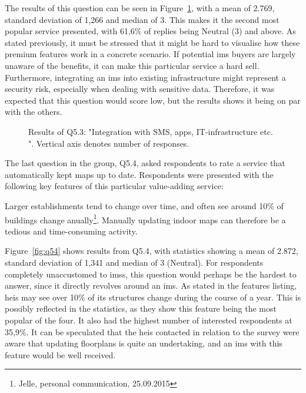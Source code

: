 The results of this question can be seen in Figure~\ref{fig:q53}, with a mean of 2.769, standard deviation of 1,266 and median of 3. This makes it the second most popular service presented, with 61,6\% of replies being Neutral (3) and above. As stated previously, it must be stressed that it might be hard to visualise how these premium features work in a concrete scenario. If potential \gls{ims} buyers are largely unaware of the benefits, it can make this particular service a hard sell. Furthermore, integrating an \gls{ims} into existing infrastructure might represent a security risk, especially when dealing with sensitive data. Therefore, it was expected that this question would score low, but the results shows it being on par with the others.  

\begin{figure}[H]
    \centering
    \caption{Results of Q5.3: "Integration with SMS, apps, IT-infrastructure etc.
". Vertical axis denotes number of responses.}
    \label{fig:q53}
\end{figure}

The last question in the group, Q5.4, asked respondents to rate a service that automatically kept maps up to date. Respondents were presented with the following key features of this particular value-adding service:

\begin{displayquote}
Larger establishments tend to change over time, and often see around 10\% of buildings change anually\footnote{Jelle, personal communication, 25.09.2015}. Manually updating indoor maps can therefore be a tedious and time-consuming activity.
\end{displayquote}

Figure~\ref{fig:q54} shows results from Q5.4, with statistics showing a mean of 2.872, standard deviation of 1,341 and median of 3 (Neutral). For respondents completely unaccustomed to \glspl{ims}, this question would perhaps be the hardest to answer, since it directly revolves around an \gls{ims}. As stated in the features listing, \glspl{hei} may see over 10\% of its structures change during the course of a year. This is possibly reflected in the statistics, as they show this feature being the most popular of the four. It also had the highest number of interested respondents at 35,9\%. It can be speculated that the \glspl{hei} contacted in relation to the survey were aware that updating floorplans is quite an undertaking, and an \gls{ims} with this feature would be well received. 


